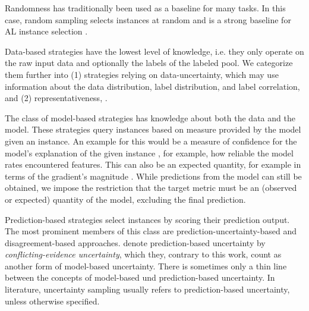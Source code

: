 Randomness has traditionally been used as a baseline for many tasks.
In this case, random sampling selects instances at random and is a strong baseline for AL instance selection .

Data-based strategies have the lowest level of knowledge, i.e. they only operate on the raw input data and optionally the labels of the labeled pool. 
We categorize them further into (1) strategies relying on data-uncertainty, which may use information about the data distribution, label distribution, and label correlation,
and (2) representativeness, .

The class of model-based strategies has knowledge about both the data and the model.
These strategies query instances based on measure provided by the model given an instance. 
An example for this would be a measure of confidence for the model's explanation of the given instance ,
for example, how reliable the model rates encountered features.
This can also be an expected quantity, for example in terms of the gradient's magnitude . 
While predictions from the model can still be obtained, we impose the restriction that the target metric must be an (observed or expected) quantity of the model, excluding the final prediction.

Prediction-based strategies select instances by scoring their prediction output.
The most prominent members of this class are prediction-uncertainty-based and disagreement-based approaches.
\textcite{sharma2017evidence-based} denote prediction-based uncertainty by {\em conflicting-evidence uncertainty}, which they, contrary to this work, count as another form of model-based uncertainty.
There is sometimes only a thin line between the concepts of model-based und prediction-based uncertainty.
In literature, uncertainty sampling  usually refers to prediction-based uncertainty, unless otherwise specified.

